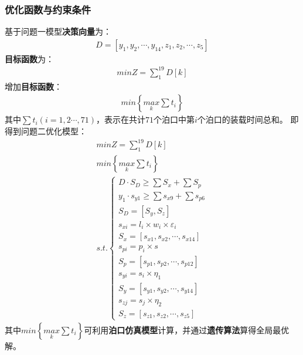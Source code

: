 \documentclass{whutmod}
\begin{document}
	    \subsubsection{优化函数与约束条件}
	基于问题一模型\textbf{决策向量}为：
	\begin{gather}
	D=[y_{1},y_{2},\cdots,y_{14},z_{1},z_{2},\cdots,z_{5}]
	\end{gather}
	\textbf{目标函数}为：
	\begin{gather}
	min Z=\sum _{1}^{19}D[k]
	\end{gather}
	增加\textbf{目标函数}：
		\begin{gather}
	min \left \{ \underset{k}{max}\sum t_{i} \right \}
	\end{gather}
	其中$\sum t_{i}(i=1,2\cdots,71)$，表示在共计$71$个泊口中第$i$个泊口的装载时间总和。
	即得到问题二优化模型：
	\begin{gather}
	min Z=\sum _{1}^{19}D[k]\\
	min \left \{ \underset{k}{max}\sum t_{i} \right \}\\
	s.t.\left\{\begin{matrix}	 D\cdot S_{D}\geq \sum  S_{x} + \sum  S_{p}
	\\ y_{1}\cdot s_{y1}\geq \sum s_{x9}+ \sum  s_{p6}
	\\S_{D}=[S_{y}, S_{z}]
	\\ s_{xi}=l_{i}\times w_{i} \times \varepsilon _{i}
	\\S_{x}=[s_{x1},s_{x2},\cdots,s_{x14}]
	\\s_{pi}=p_{i}\times s
	\\S_{p}=[s_{p1},s_{p2},\cdots,s_{p12}]
	\\     s_{yi}=s_{i}\times \eta_{1}
	\\   S_{y}=[s_{y1},s_{y2},\cdots,s_{y14}]
	\\      s_{zj}=s_{j}\times \eta_{2}
	\\ S_{z}=[s_{z1},s_{z2},\cdots,s_{z5}]
	\end{matrix}\right. 
	\end{gather}
	其中$min \left \{ \underset{k}{max}\sum t_{i} \right \}$可利用\textbf{泊口仿真模型}计算，并通过\textbf{遗传算法}算得全局最优解。
\end{document}
